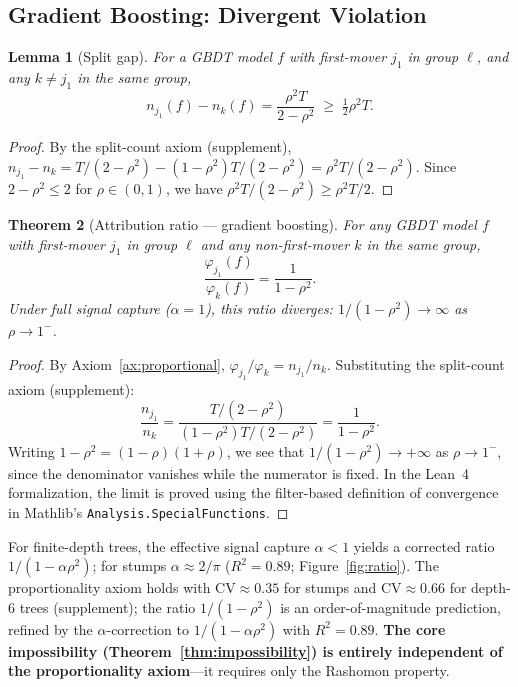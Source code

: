 \documentclass{article}
\newtheorem{theorem}{Theorem}
\newtheorem{lemma}[theorem]{Lemma}
\newcommand{\GBDT}{\textsc{GBDT}}
\begin{document}
\subsection{Gradient Boosting: Divergent Violation}
\label{sec:gbdt-bounds}

\begin{lemma}[Split gap]
\label{lem:split-gap}
For a \GBDT{} model $f$ with first-mover $j_1$ in group $\ell$, and any $k \neq j_1$ in the same group,
\[
    n_{j_1}(f) - n_k(f) = \frac{\rho^2 T}{2 - \rho^2} \;\geq\; \tfrac{1}{2}\rho^2 T.
\]
\end{lemma}

\begin{proof}
By the split-count axiom (supplement), $n_{j_1} - n_k = T/(2-\rho^2) - (1-\rho^2)T/(2-\rho^2) = \rho^2 T/(2-\rho^2)$.
Since $2 - \rho^2 \leq 2$ for $\rho \in (0,1)$, we have $\rho^2 T/(2-\rho^2) \geq \rho^2 T/2$.
\end{proof}

\begin{theorem}[Attribution ratio --- gradient boosting]
\label{thm:ratio}
For any \GBDT{} model $f$ with first-mover $j_1$ in group $\ell$ and any non-first-mover $k$ in the same group,
\[
    \frac{\varphi_{j_1}(f)}{\varphi_k(f)} = \frac{1}{1 - \rho^2}.
\]
Under full signal capture ($\alpha{=}1$), this ratio diverges: $1/(1-\rho^2) \to \infty$ as $\rho \to 1^-$.
\end{theorem}

\begin{proof}
By Axiom~\ref{ax:proportional}, $\varphi_{j_1}/\varphi_k = n_{j_1}/n_k$.
Substituting the split-count axiom (supplement):
\[
    \frac{n_{j_1}}{n_k} = \frac{T/(2-\rho^2)}{(1-\rho^2)T/(2-\rho^2)} = \frac{1}{1-\rho^2}.
\]
Writing $1-\rho^2 = (1-\rho)(1+\rho)$, we see that $1/(1-\rho^2) \to +\infty$ as $\rho \to 1^-$, since the denominator vanishes while the numerator is fixed.
In the Lean~4 formalization, the limit is proved using the filter-based definition of convergence in Mathlib's \texttt{Analysis.SpecialFunctions}.
\end{proof}

For finite-depth trees, the effective signal capture $\alpha < 1$ yields a corrected ratio $1/(1{-}\alpha\rho^2)$; for stumps $\alpha \approx 2/\pi$ ($R^2{=}0.89$; Figure~\ref{fig:ratio}).
The proportionality axiom holds with CV${\approx}0.35$ for stumps and CV${\approx}0.66$ for depth-6 trees (supplement); the ratio $1/(1{-}\rho^2)$ is an order-of-magnitude prediction, refined by the $\alpha$-correction to $1/(1{-}\alpha\rho^2)$ with $R^2 = 0.89$.
\textbf{The core impossibility (Theorem~\ref{thm:impossibility}) is entirely independent of the proportionality axiom}---it requires only the Rashomon property.
\end{document}
